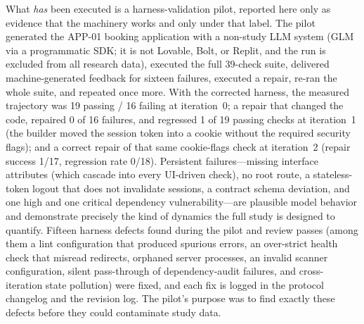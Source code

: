 What \emph{has} been executed is a harness-validation pilot, reported here only as
evidence that the machinery works and only under that label. The pilot generated the
APP-01 booking application with a non-study LLM system (GLM via a programmatic SDK;
it is not Lovable, Bolt, or Replit, and the run is excluded from all research data),
executed the full 39-check suite, delivered machine-generated feedback for sixteen
failures, executed a repair, re-ran the whole suite, and repeated once more. With
the corrected harness, the measured trajectory was 19 passing / 16 failing at
iteration~0; a repair that changed the code, repaired 0 of 16 failures, and
regressed 1 of 19 passing checks at iteration~1 (the builder moved the session token
into a cookie without the required security flags); and a correct repair of that
same cookie-flags check at iteration~2 (repair success 1/17, regression rate 0/18).
Persistent failures---missing interface attributes (which cascade into every
UI-driven check), no root route, a stateless-token logout that does not invalidate
sessions, a contract schema deviation, and one high and one critical dependency
vulnerability---are plausible model behavior and demonstrate precisely the kind of
dynamics the full study is designed to quantify. Fifteen harness defects found
during the pilot and review passes (among them a lint configuration that produced
spurious errors, an over-strict health check that misread redirects, orphaned server
processes, an invalid scanner configuration, silent pass-through of dependency-audit
failures, and cross-iteration state pollution) were fixed, and each fix is logged in
the protocol changelog and the revision log. The pilot's purpose was to find exactly
these defects before they could contaminate study data.
